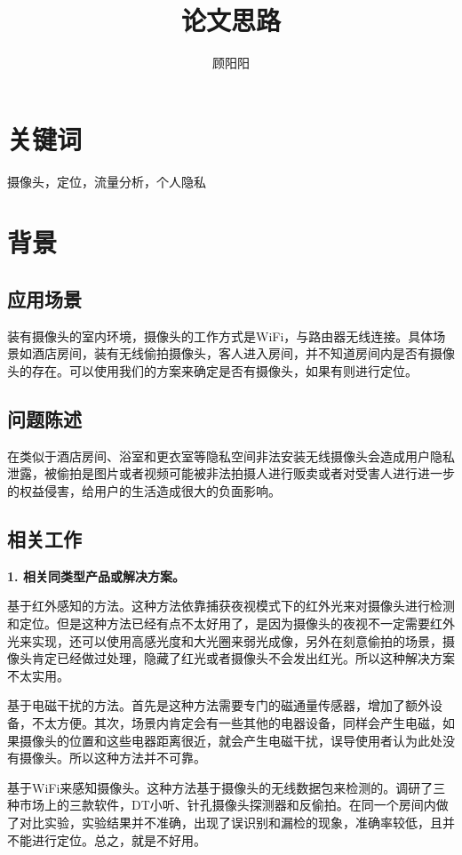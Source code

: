 \documentclass[UTF8]{ctexart}
\title{论文思路}
\author{顾阳阳}
\begin{document}
\maketitle
\section{关键词}
摄像头，定位，流量分析，个人隐私

\section{背景}
\subsection{应用场景}
装有摄像头的室内环境，摄像头的工作方式是WiFi，与路由器无线连接。具体场景如酒店房间，装有无线偷拍摄像头，客人进入房间，并不知道房间内是否有摄像头的存在。可以使用我们的方案来确定是否有摄像头，如果有则进行定位。

\subsection{问题陈述}
在类似于酒店房间、浴室和更衣室等隐私空间非法安装无线摄像头会造成用户隐私泄露，被偷拍是图片或者视频可能被非法拍摄人进行贩卖或者对受害人进行进一步的权益侵害，给用户的生活造成很大的负面影响。

\subsection{相关工作}
\textbf{1. 相关同类型产品或解决方案。}

基于红外感知的方法。这种方法依靠捕获夜视模式下的红外光来对摄像头进行检测和定位。但是这种方法已经有点不太好用了，是因为摄像头的夜视不一定需要红外光来实现，还可以使用高感光度和大光圈来弱光成像，另外在刻意偷拍的场景，摄像头肯定已经做过处理，隐藏了红光或者摄像头不会发出红光。所以这种解决方案不太实用。

基于电磁干扰的方法。首先是这种方法需要专门的磁通量传感器，增加了额外设备，不太方便。其次，场景内肯定会有一些其他的电器设备，同样会产生电磁，如果摄像头的位置和这些电器距离很近，就会产生电磁干扰，误导使用者认为此处没有摄像头。所以这种方法并不可靠。

基于WiFi来感知摄像头。这种方法基于摄像头的无线数据包来检测的。调研了三种市场上的三款软件，DT小听、针孔摄像头探测器和反偷拍。在同一个房间内做了对比实验，实验结果并不准确，出现了误识别和漏检的现象，准确率较低，且并不能进行定位。总之，就是不好用。
\end{document}
